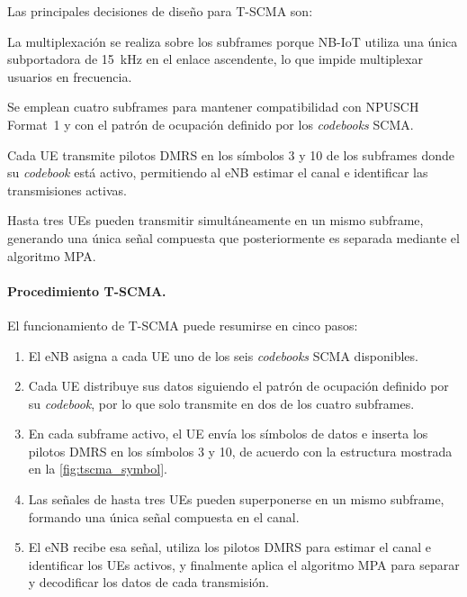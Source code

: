 Las principales decisiones de diseño para T-SCMA son:

\begin{description}[leftmargin=1.5em,style=nextline]

\item[Dominio del tiempo.] La multiplexación se realiza sobre los subframes porque NB-IoT utiliza una única subportadora de 15~kHz en el enlace ascendente, lo que impide multiplexar usuarios en frecuencia.

\item[Cuatro subframes.] Se emplean cuatro subframes para mantener compatibilidad con NPUSCH Format~1 y con el patrón de ocupación definido por los \textit{codebooks} SCMA.

\item[Pilotos DMRS.] Cada UE transmite pilotos DMRS en los símbolos 3 y 10 de los subframes donde su \textit{codebook} está activo, permitiendo al eNB estimar el canal e identificar las transmisiones activas.

\item[Superposición.] Hasta tres UEs pueden transmitir simultáneamente en un mismo subframe, generando una única señal compuesta que posteriormente es separada mediante el algoritmo MPA.

\end{description}

\paragraph{Procedimiento T-SCMA.}

El funcionamiento de T-SCMA puede resumirse en cinco pasos:

\begin{enumerate}
    \item El eNB asigna a cada UE uno de los seis \textit{codebooks} SCMA disponibles.
    \item Cada UE distribuye sus datos siguiendo el patrón de ocupación definido por su \textit{codebook}, por lo que solo transmite en dos de los cuatro subframes.
    \item En cada subframe activo, el UE envía los símbolos de datos e inserta los pilotos DMRS en los símbolos 3 y 10, de acuerdo con la estructura mostrada en la \cref{fig:tscma_symbol}.
    \item Las señales de hasta tres UEs pueden superponerse en un mismo subframe, formando una única señal compuesta en el canal.
    \item El eNB recibe esa señal, utiliza los pilotos DMRS para estimar el canal e identificar los UEs activos, y finalmente aplica el algoritmo MPA para separar y decodificar los datos de cada transmisión.
\end{enumerate}

